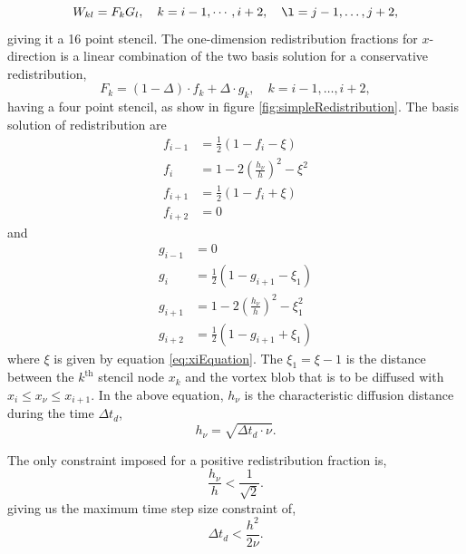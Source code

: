 	\begin{equation}
	W_{kl} = F_k G_l, \quad k = i-1,\cdots,i+2, \quad \l = j-1,\dots,j+2,
	\end{equation}
giving it a 16 point stencil. The one-dimension redistribution fractions for $x$-direction is a linear combination of the two basis solution for a conservative redistribution,
	\begin{equation}
	F_k = \left(1-\Delta\right)\cdot f_k + \Delta\cdot g_k, \quad k = i-1,\dots,i+2,
	\end{equation}
having a four point stencil, as show in figure \ref{fig:simpleRedistribution}. The basis solution of redistribution are 
	\begin{subequations}
	\begin{align}
	f_{i-1} &= \frac{1}{2}\left(1-f_i-\xi\right)\\
	f_i &= 1 - 2\left(\frac{h_{\nu}}{h}\right)^2 - \xi^2\\
	f_{i+1} &= \frac{1}{2}\left(1-f_i+\xi\right)\\
	f_{i+2} &= 0
	\end{align}
	\end{subequations}
and 	
	\begin{subequations}
	\begin{align}
	g_{i-1} &= 0\\
	g_{i} &= \frac{1}{2}\left(1-g_{i+1}-\xi_1\right)\\
	g_{i+1} &= 1 - 2\left(\frac{h_{\nu}}{h}\right)^2 - \xi_1^2\\
	g_{i+2} &= \frac{1}{2}\left(1-g_{i+1}+\xi_1\right)
	\end{align}
	\end{subequations}
where $\xi$ is given by equation \ref{eq:xiEquation}. The $\xi_1 = \xi - 1$ is the distance between the $k^{\mathrm{th}}$ stencil node $x_k$ and the vortex blob that is to be diffused with $x_i \leqslant x_{\nu} \leqslant x_{i+1}$. In the above equation, $h_{\nu}$ is the characteristic diffusion distance during the time $\Delta t_d$, 
	\begin{equation}
	h_{\nu} = \sqrt{\Delta t_d \cdot \nu}.
	\end{equation}
		
The only constraint imposed for a positive redistribution fraction is,
	\begin{equation}
	\frac{h_{\nu}}{h} < \frac{1}{\sqrt{2}}.
	\end{equation}
giving us the maximum time step size constraint of,
	\begin{equation}
	\Delta t_d < \frac{h^2}{2\nu}.
	\end{equation}
	
